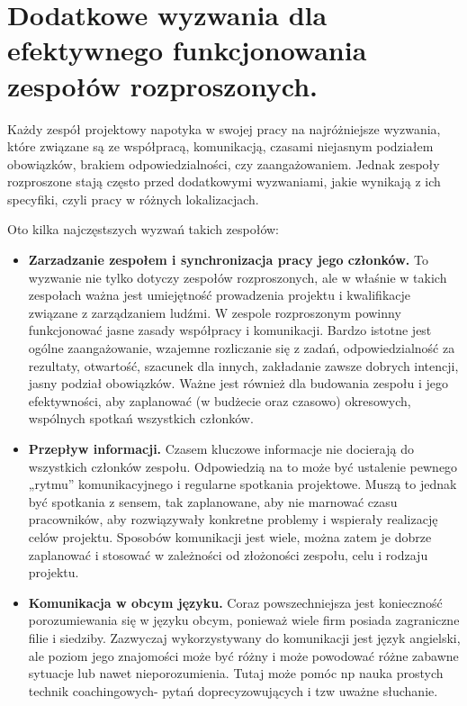 \section{Dodatkowe wyzwania dla efektywnego funkcjonowania zespołów rozproszonych.}

Każdy zespół projektowy napotyka w swojej pracy na najróżniejsze wyzwania, które związane są ze współpracą, komunikacją, czasami niejasnym podziałem obowiązków, brakiem odpowiedzialności, czy zaangażowaniem. Jednak zespoły rozproszone stają często przed dodatkowymi wyzwaniami, jakie wynikają z ich specyfiki, czyli pracy w różnych lokalizacjach.

Oto kilka najczęstszych wyzwań takich zespołów:

\begin{itemize}
	\item \textbf{Zarzadzanie zespołem i synchronizacja pracy jego członków.}
	To wyzwanie nie tylko dotyczy zespołów rozproszonych,
	ale w właśnie w takich zespołach ważna jest umiejętność prowadzenia projektu i kwalifikacje związane z zarządzaniem ludźmi.
	W zespole rozproszonym powinny funkcjonować jasne zasady współpracy i komunikacji.
	Bardzo istotne jest ogólne zaangażowanie, wzajemne rozliczanie się z zadań, odpowiedzialność za rezultaty,
	otwartość, szacunek dla innych, zakładanie zawsze dobrych intencji, jasny podział obowiązków.
	Ważne jest również dla budowania zespołu i jego efektywności, aby zaplanować (w budżecie oraz czasowo) okresowych,
	wspólnych spotkań wszystkich członków.
	\item \textbf{Przepływ informacji.}
	Czasem kluczowe informacje nie docierają do wszystkich członków zespołu.
	Odpowiedzią na to może być ustalenie pewnego „rytmu” komunikacyjnego i regularne spotkania projektowe.
	Muszą to jednak być spotkania z sensem, tak zaplanowane, aby nie marnować czasu pracowników,
	aby rozwiązywały konkretne problemy i wspierały realizację celów projektu.
	Sposobów komunikacji jest wiele, można zatem je dobrze zaplanować i stosować w zależności od złożoności zespołu, celu i rodzaju projektu.
	\item \textbf{Komunikacja w obcym języku.}
	Coraz powszechniejsza jest konieczność porozumiewania się w języku obcym,
	ponieważ wiele firm posiada zagraniczne filie i siedziby.
	Zazwyczaj wykorzystywany do komunikacji jest język angielski,
	ale poziom jego znajomości może być różny i może powodować różne zabawne sytuacje lub nawet nieporozumienia.
	Tutaj może pomóc np nauka prostych technik coachingowych- pytań doprecyzowujących i tzw uważne słuchanie.
\end{itemize}

